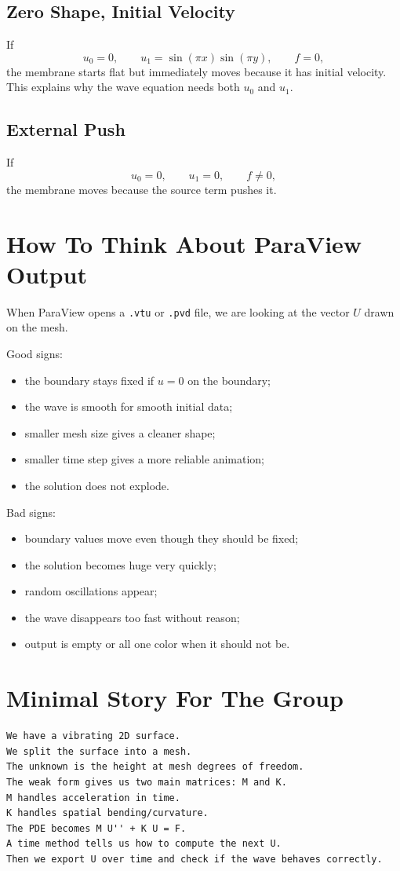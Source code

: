 \documentclass[11pt,a4paper]{article}
\begin{document}
\subsection*{Zero Shape, Initial Velocity}
If
\[
u_0=0,\qquad u_1=\sin(\pi x)\sin(\pi y),\qquad f=0,
\]
the membrane starts flat but immediately moves because it has initial velocity.
This explains why the wave equation needs both \(u_0\) and \(u_1\).

\subsection*{External Push}
If
\[
u_0=0,\qquad u_1=0,\qquad f\neq 0,
\]
the membrane moves because the source term pushes it.

\section{How To Think About ParaView Output}
When ParaView opens a \texttt{.vtu} or \texttt{.pvd} file, we are looking at the vector
\(U\) drawn on the mesh.

Good signs:
\begin{itemize}
\item the boundary stays fixed if \(u=0\) on the boundary;
\item the wave is smooth for smooth initial data;
\item smaller mesh size gives a cleaner shape;
\item smaller time step gives a more reliable animation;
\item the solution does not explode.
\end{itemize}

Bad signs:
\begin{itemize}
\item boundary values move even though they should be fixed;
\item the solution becomes huge very quickly;
\item random oscillations appear;
\item the wave disappears too fast without reason;
\item output is empty or all one color when it should not be.
\end{itemize}

\section{Minimal Story For The Group}
\begin{verbatim}
We have a vibrating 2D surface.
We split the surface into a mesh.
The unknown is the height at mesh degrees of freedom.
The weak form gives us two main matrices: M and K.
M handles acceleration in time.
K handles spatial bending/curvature.
The PDE becomes M U'' + K U = F.
A time method tells us how to compute the next U.
Then we export U over time and check if the wave behaves correctly.
\end{verbatim}
\end{document}

